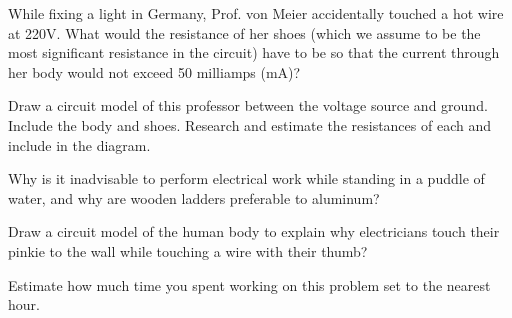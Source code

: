 \documentclass{article}
\begin{document}


\subproblem
While fixing a light in Germany, Prof. von Meier accidentally
touched a hot wire at 220V.  What would the resistance of her shoes
(which we assume to be the most significant resistance in the
circuit) have to be so that the current through her body would not
exceed 50 milliamps (mA)?

\subproblem
Draw a circuit model of this professor between the voltage source and
ground.  Include the body and shoes.  Research and estimate the
resistances of each and include in the diagram.

\subproblem
Why is it inadvisable to perform electrical work while standing
in a puddle of water, and why are wooden ladders preferable to
aluminum?

\subproblem
Draw a circuit model of the human body to explain why electricians touch
their pinkie to the wall while touching a wire with their thumb?

%
%
%
%
%
%
%
%
%
%
%


%
%


Estimate how much time you spent working on this problem set to the
nearest hour.
\end{document}
